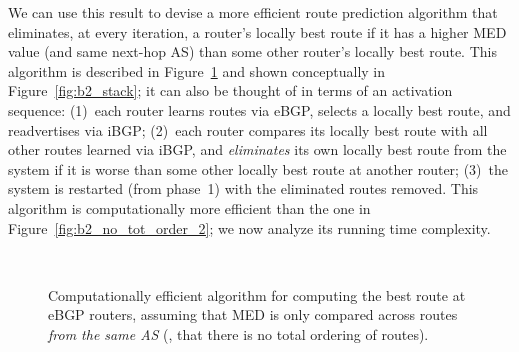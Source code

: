 We can use this result to devise a more efficient route prediction
algorithm that eliminates, at every iteration, a router's locally best
route if it has
a higher MED value (and same next-hop AS) than some other router's
locally best route.  This algorithm is described in
Figure~\ref{fig:b2_no_tot_order} and shown conceptually in
Figure~\ref{fig:b2_stack}; it can also be thought of in terms of
an activation sequence: (1)~each router learns routes via eBGP, selects
a locally best route, and readvertises via iBGP; (2)~each router
compares its locally best route with all other routes learned via iBGP,
and {\em eliminates} its own locally best route from the system if it is
worse than some other locally best route at another router; (3)~the system is restarted
(from phase~1) with the eliminated routes removed.   This algorithm is
computationally more efficient than the one in
Figure~\ref{fig:b2_no_tot_order_2}; we now analyze its running time
complexity. 

\begin{figure}
 \\
\centering{}
\caption[Efficient Algorithm: Full Mesh, MED]{Computationally efficient
  algorithm 
  for computing the best 
  route at eBGP routers, assuming that MED is only compared across
  routes {\em from the same AS} (\ie, that there is no total ordering
  of routes).}
\label{fig:b2_no_tot_order}
\end{figure}


